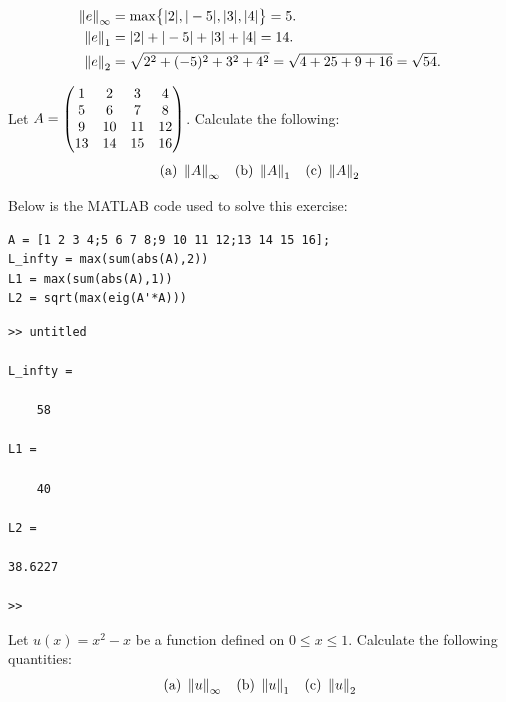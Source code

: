 \documentclass[12pt,twoside,openany]{memoir}
\begin{document}
\begin{solution}
    \begin{equation*}
    \begin{split}
        \lnorm e \rnorm_\infty & = \max\bigl\{|2|,|-5|,|3|,|4|\bigr\} = 5.\\
        \lnorm e \rnorm_1 & = |2| + |-5| + |3| + |4| = 14.\\
        \lnorm e \rnorm_2 & = \sqrt{2^2 +(-5)^2 + 3^2 + 4^2} = \sqrt{4 + 25 + 9 + 16} = \sqrt{54}.\\
    \end{split}
    \end{equation*}
\end{solution}
\begin{exercise}[manual-num={A.2}]
    Let $A = \bmat 1 & 2 & 3 & 4 \\ 5 & 6 & 7 & 8 \\ 9 & 10 & 11 & 12 \\ 13 & 14 & 15 & 16\emat$. Calculate the following:
        \begin{equation*}
        \begin{split}
            \text{(a)}\h3\lnorm A \rnorm_\infty\h9\text{(b)}\h3\lnorm A \rnorm_1\h9\text{(c)}\h3\lnorm A \rnorm_2
        \end{split}
        \end{equation*}
\end{exercise}

\begin{solution}
    Below is the \textsc{MATLAB} code used to solve this exercise:
    \begin{lstlisting}[style=MatlabEditorGrey]
A = [1 2 3 4;5 6 7 8;9 10 11 12;13 14 15 16];
L_infty = max(sum(abs(A),2))
L1 = max(sum(abs(A),1))
L2 = sqrt(max(eig(A'*A)))
    \end{lstlisting}

    \begin{lstlisting}[style=Matlab-console]
>> untitled

L_infty =

    58

L1 =

    40

L2 =

38.6227

>>
    \end{lstlisting}
\end{solution}
\begin{exercise}[manual-num={A.3}]
    Let $u(x) = x^2 - x$ be a function defined on $0 \leq x \leq 1$. Calculate the following quantities:
    \begin{equation*}
    \begin{split}
        \text{(a)}\h3\lnorm u \rnorm_\infty\h9\text{(b)}\h3\lnorm u \rnorm_1\h9\text{(c)}\h3\lnorm u \rnorm_2
    \end{split}
    \end{equation*}
\end{exercise}
\end{document}
